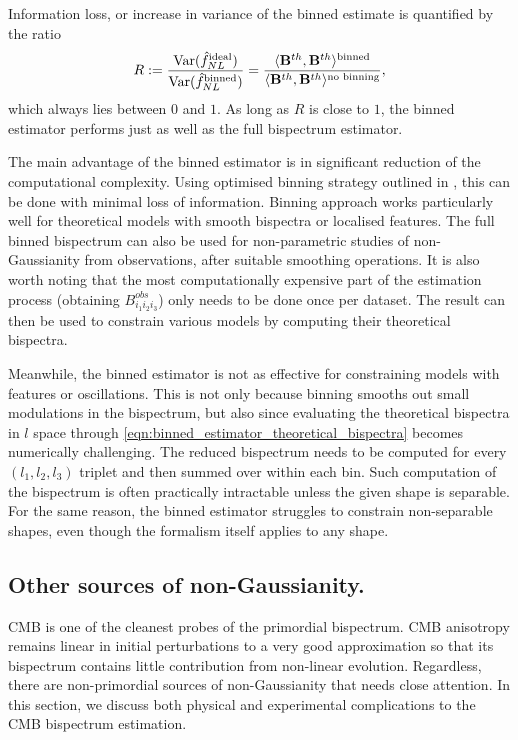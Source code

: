 Information loss, or increase in variance of the binned estimate is quantified by the ratio
\begin{align}
	R := \frac{\text{Var}(\hat{f}^\text{ideal}_{NL})}{\text{Var}(\hat{f}^\text{binned}_{NL})} = \frac{\langle \mathbf{B}^{th}, \mathbf{B}^{th} \rangle^\text{binned}}{\langle \mathbf{B}^{th}, \mathbf{B}^{th} \rangle^\text{no binning}}, 
\end{align}
which always lies between $0$ and $1$. As long as $R$ is close to $1$, the binned estimator performs just as well as the full bispectrum estimator.

The main advantage of the binned estimator is in significant reduction of the computational complexity. Using optimised binning strategy outlined in \cite{Bucher2016}, this can be done with minimal loss of information. Binning approach works particularly well for theoretical models with smooth bispectra or localised features. The full binned bispectrum can also be used for non-parametric studies of non-Gaussianity from observations, after suitable smoothing operations. It is also worth noting that the most computationally expensive part of the estimation process (obtaining $B^{obs}_{i_1 i_2 i_3}$) only needs to be done once per dataset. The result can then be used to constrain various models by computing their theoretical bispectra.

Meanwhile, the binned estimator is not as effective for constraining models with features or oscillations. This is not only because binning smooths out small modulations in the bispectrum, but also since evaluating the theoretical bispectra in $l$ space through \eqref{eqn:binned_estimator_theoretical_bispectra} becomes numerically challenging. The reduced bispectrum needs to be computed for every $(l_1,l_2,l_3)$ triplet and then summed over within each bin. Such computation of the bispectrum is often practically intractable unless the given shape is separable. For the same reason, the binned estimator struggles to constrain non-separable shapes, even though the formalism itself applies to any shape.


\subsection{Other sources of non-Gaussianity.} \label{section:other_sources_of_non_gaussianity}

CMB is one of the cleanest probes of the primordial bispectrum. CMB anisotropy remains linear in initial perturbations to a very good approximation so that its bispectrum contains little contribution from non-linear evolution. Regardless, there are non-primordial sources of non-Gaussianity that needs close attention. In this section, we discuss both physical and experimental complications to the CMB bispectrum estimation.

